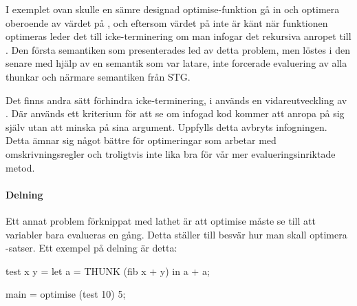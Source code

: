 \documentclass[Rapport]{subfiles}
\begin{document}
I exemplet ovan skulle en sämre designad optimise-funktion gå in och optimera  oberoende av värdet på
, och eftersom värdet på  inte är känt när funktionen optimeras leder det till
icke-terminering om man infogar det rekursiva anropet till .
    Den första semantiken som presenterades led av detta problem, men löstes i den senare med hjälp av
en semantik som var latare, inte forcerade evaluering av alla thunkar och närmare semantiken från STG.

Det finns andra sätt förhindra icke-terminering, i \cite{mitchell2007supercompiler} 
används en vidareutveckling av \cite{home-emb}. Där används ett kriterium för att se om infogad kod kommer att anropa på sig själv utan att minska på sina argument. Uppfylls detta avbryts infogningen. Detta ämnar sig något bättre för optimeringar som arbetar med omskrivningsregler och troligtvis inte lika bra för vår mer evalueringsinriktade metod.


\begin{comment}
\subsection{Optimise-with}
En annan möjlig lösning på problemet ovan är att låta programmeraren själv avgöra hur
många gånger en funktion får infogas, som här:

\begin{codeEx}
main = optimise (take 5) with { inline take 5 } [1,2,3,4,5,6,7];
\end{codeEx}

I exemplet ovan betyder \ic{inline take 5} att \ic{take} bara får infogas $5$ gånger.
En funktionalitet som skulle kunna gynna optimise, eller användandet av den,
är att den skulle kunna detektera när den potentiellt skulle falla in i en
oändlig infogningsloop. Det har inte gjorts till det här arbetet.
\end{comment}

\paragraph{Delning}
Ett annat problem förknippat med lathet är att optimise måste se till att variabler bara 
evalueras en gång. Detta ställer till besvär hur man skall optimera -satser.
Ett exempel på delning är detta:

\begin{codeEx}
test x y = let
    { a = THUNK (fib x + y)
    } in a + a;

main = optimise (test 10) 5;
\end{codeEx}
\end{document}
